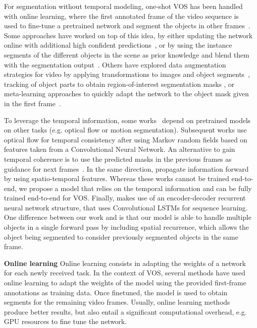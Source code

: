 \documentclass[10pt,twocolumn,letterpaper]{article}
\begin{document}
For segmentation without temporal modeling, one-shot VOS has been handled with online learning, where the first annotated frame of the video sequence is used to fine-tune a pretrained network and segment the objects in other frames~\cite{caelles2017one}. Some approaches have worked on top of this idea, by either updating the network online with additional high confident predictions~\cite{voigtlaender2017online}, or by using the instance segments of the different objects in the scene as prior knowledge and blend them with the segmentation output~\cite{maninis2018video}.
Others have explored data augmentation strategies for video by applying transformations to images and object segments~\cite{khoreva2017lucid}, tracking of object parts to obtain region-of-interest segmentation masks \cite{Cheng_favos_2018}, or meta-learning approaches to quickly adapt the network to the object mask given in the first frame~\cite{yang2018efficient}. 


To leverage the temporal information, some works~\cite{cheng2017segflow, jain2017fusionseg, tokmakov2017learning, nilsson2018} depend on pretrained models on other tasks (e.g. optical flow or motion segmentation). Subsequent works \cite{bao2018cnn} use optical flow for temporal consistency after using Markov random fields based on features taken from a Convolutional Neural Network.  An alternative to gain temporal coherence is to use the predicted masks in the previous frames as guidance for next frames~\cite{perazzi2017learning, yang2018efficient, hu2017maskrnn, jang2017}. In the same direction, \cite{jampani2017video} propagate information forward by using spatio-temporal features.
Whereas these works cannot be trained end-to-end, we propose a model that relies on the temporal information and can be fully trained end-to-end for VOS. Finally, \cite{xu2018youtube} makes use of an encoder-decoder recurrent neural network structure, that uses Convolutional LSTMs for sequence learning. One difference between our work and \cite{xu2018youtube} is that our model is able to handle multiple objects in a single forward pass by including spatial recurrence, which allows the object being segmented to consider previously segmented objects in the same frame. 



\iffalse
\textbf{Online learning} Online learning consists in adapting the weights of a network for each newly received task. In the context of VOS, several methods \cite{caelles2017one, cheng2017segflow, perazzi2017learning, khoreva2017lucid, voigtlaender2017online, maninis2018video} have used online learning to adapt the weights of the model using the provided first-frame annotations as training data. Once finetuned, the model is used to obtain segments for the remaining video frames. Usually, online learning methods produce better results, but also entail a significant computational overhead, e.g. GPU resources to fine tune the network.
\end{document}
